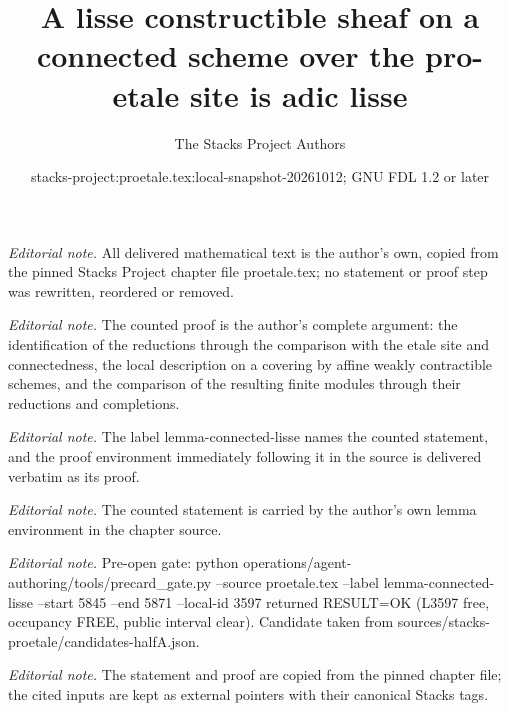 \documentclass[10pt,a4paper]{amsart}
\title{A lisse constructible sheaf on a connected scheme over the pro-etale site is adic lisse}
\author{The Stacks Project Authors}
\date{stacks-project:proetale.tex:local-snapshot-20261012; GNU FDL 1.2 or later}
\theoremstyle{plain}
\theoremstyle{definition}
\theoremstyle{remark}
\numberwithin{equation}{subsection}
\begin{document}
\maketitle
\noindent\textit{Editorial note.} All delivered mathematical text is the author's own, copied from the pinned Stacks Project chapter file proetale.tex; no statement or proof step was rewritten, reordered or removed.\par\medskip
\noindent\textit{Editorial note.} The counted proof is the author's complete argument: the identification of the reductions through the comparison with the etale site and connectedness, the local description on a covering by affine weakly contractible schemes, and the comparison of the resulting finite modules through their reductions and completions.\par\medskip
\noindent\textit{Editorial note.} The label lemma-connected-lisse names the counted statement, and the proof environment immediately following it in the source is delivered verbatim as its proof.\par\medskip
\noindent\textit{Editorial note.} The counted statement is carried by the author's own lemma environment in the chapter source.\par\medskip
\noindent\textit{Editorial note.} Pre-open gate: python operations/agent-authoring/tools/precard\_gate.py --source proetale.tex --label lemma-connected-lisse --start 5845 --end 5871 --local-id 3597 returned RESULT=OK (L3597 free, occupancy FREE, public interval clear). Candidate taken from sources/stacks-proetale/candidates-halfA.json.\par\medskip
\noindent\textit{Editorial note.} The statement and proof are copied from the pinned chapter file; the cited inputs are kept as external pointers with their canonical Stacks tags.\par\medskip
\end{document}
